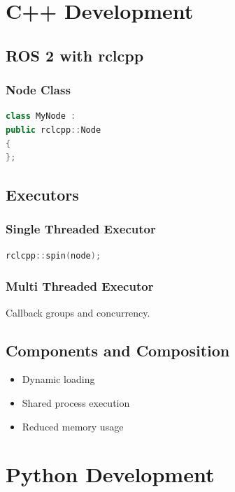 \documentclass[11pt,oneside]{book}
\begin{document}
\part{C++ Development}

\chapter{ROS 2 with rclcpp}

\section{Node Class}

\begin{lstlisting}[language=C++]
class MyNode :
public rclcpp::Node
{
};
\end{lstlisting}

\chapter{Executors}

\section{Single Threaded Executor}

\begin{lstlisting}[language=C++]
rclcpp::spin(node);
\end{lstlisting}

\section{Multi Threaded Executor}

Callback groups and concurrency.

\chapter{Components and Composition}

\begin{itemize}
\item Dynamic loading
\item Shared process execution
\item Reduced memory usage
\end{itemize}

\part{Python Development}
\end{document}
